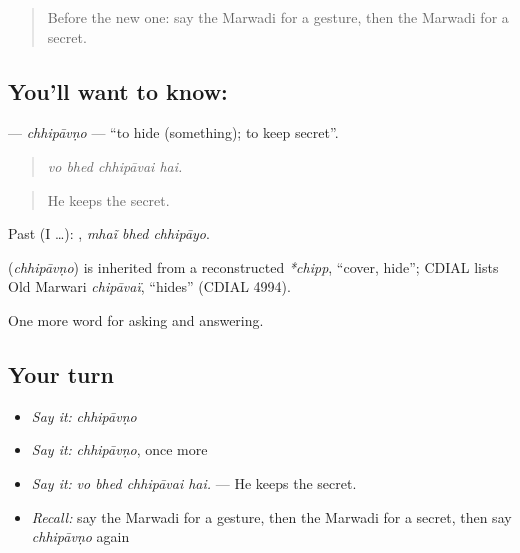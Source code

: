 \label{lesson:MW-C273-chhipavno}



\begin{quote}
Before the new one: say the Marwadi for a gesture, then the Marwadi for a secret.
\end{quote}

\subsection*{You'll want to know: }
\textbf{} — \emph{chhipāvṇo} — \textquotedblleft{}to hide (something); to keep secret\textquotedblright{}.

\begin{quote}
   
\end{quote}

\begin{quote}
\emph{vo bhed chhipāvai hai.}
\end{quote}

\begin{quote}
He keeps the secret.
\end{quote}

Past (I …):   , \emph{mhaĩ bhed chhipāyo}.

\begin{cousinweb}
\textbf{} (\emph{chhipāvṇo}) is inherited from a reconstructed \emph{*chipp}, \textquotedblleft{}cover, hide\textquotedblright{}; CDIAL lists Old Marwari \emph{chipāvaï}, \textquotedblleft{}hides\textquotedblright{} (CDIAL 4994).
\end{cousinweb}

\begin{grammarlens}[title={What you've built}]
One more word for asking and answering.
\end{grammarlens}

\subsection*{Your turn}
\begin{itemize}
\raggedright
  \item \emph{Say it:} \emph{chhipāvṇo}
  \item \emph{Say it:} \emph{chhipāvṇo}, once more
  \item \emph{Say it:} \emph{vo bhed chhipāvai hai.} — He keeps the secret.
  \item \emph{Recall:} say the Marwadi for a gesture, then the Marwadi for a secret, then say \emph{chhipāvṇo} again
\end{itemize}

